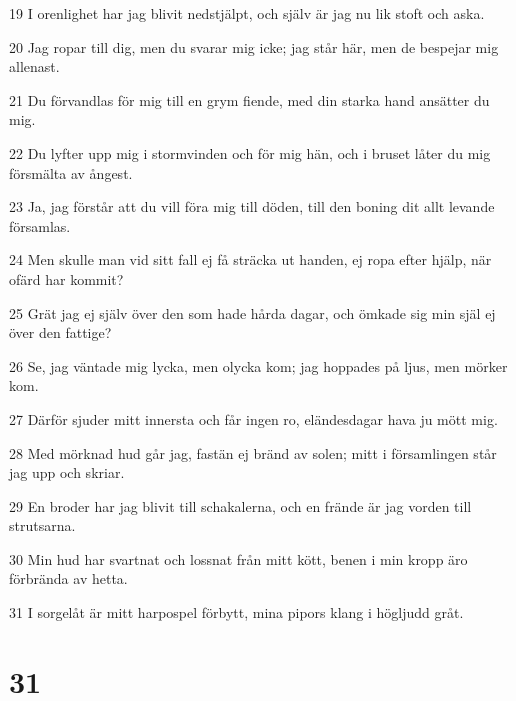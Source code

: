\par 19 I orenlighet har jag blivit nedstjälpt, och själv är jag nu lik stoft och aska.
\par 20 Jag ropar till dig, men du svarar mig icke; jag står här, men de bespejar mig allenast.
\par 21 Du förvandlas för mig till en grym fiende, med din starka hand ansätter du mig.
\par 22 Du lyfter upp mig i stormvinden och för mig hän, och i bruset låter du mig försmälta av ångest.
\par 23 Ja, jag förstår att du vill föra mig till döden, till den boning dit allt levande församlas.
\par 24 Men skulle man vid sitt fall ej få sträcka ut handen, ej ropa efter hjälp, när ofärd har kommit?
\par 25 Grät jag ej själv över den som hade hårda dagar, och ömkade sig min själ ej över den fattige?
\par 26 Se, jag väntade mig lycka, men olycka kom; jag hoppades på ljus, men mörker kom.
\par 27 Därför sjuder mitt innersta och får ingen ro, eländesdagar hava ju mött mig.
\par 28 Med mörknad hud går jag, fastän ej bränd av solen; mitt i församlingen står jag upp och skriar.
\par 29 En broder har jag blivit till schakalerna, och en frände är jag vorden till strutsarna.
\par 30 Min hud har svartnat och lossnat från mitt kött, benen i min kropp äro förbrända av hetta.
\par 31 I sorgelåt är mitt harpospel förbytt, mina pipors klang i högljudd gråt.

\chapter{31}

